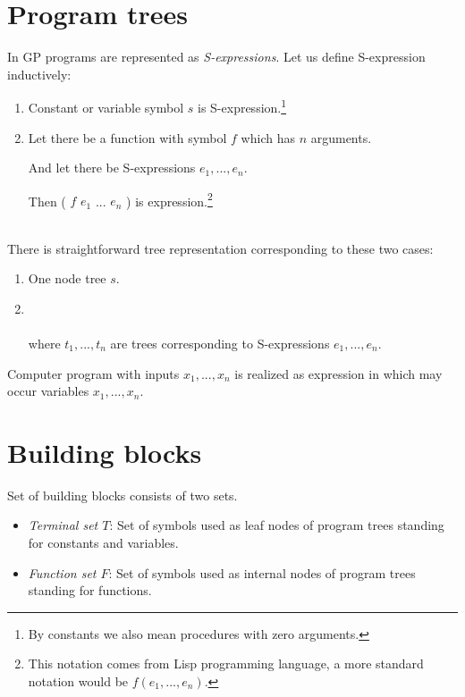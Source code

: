 \documentclass[12pt,a4paper]{report}
\newcommand{\Lets}{Let us\xspace}
\begin{document}
\newpage
\section{Program trees}
\label{GP-prog-trees}

In GP programs are represented as \textit{S-expressions}. 
\Lets define S-expression inductively:

\begin{samepage}
\begin{enumerate}
	\item Constant or variable symbol $s$ is S-expression.\footnote{
	      By constants we also mean procedures with zero arguments.}
	\item Let there be a function with symbol $f$ which has $n$ arguments.
	 
	      And let there be S-expressions $e_{1}, ..., e_{n}$. 
	      
	      Then ( $f$ $e_{1}$ ... $e_{n}$ ) is expression.\footnote{
	      This notation comes from Lisp programming language, 
	      a more standard notation would be $f(e_{1}, ... ,e_{n})$.}   
\end{enumerate}
\end{samepage}~\\
There is straightforward tree representation corresponding to these two cases:

\begin{enumerate}
	\item One node tree $s$.
    \item \mbox{}\\\\
		 where $t_{1}, ..., t_{n}$ are trees corresponding 
		 to S-expressions $e_{1}, ..., e_{n}$.	   
\end{enumerate}

Computer program with inputs $x_{1}, ..., x_{n}$ is realized as expression in which 
may occur variables $x_{1}, ..., x_{n}$.



\section{Building blocks}
\label{building-blocks}

Set of building blocks consists of two sets.

\begin{itemize}
	\item \textit{Terminal set $T$}: Set of symbols used as leaf nodes of 	               
	      program trees standing for constants and variables.
	\item \textit{Function set $F$}: Set of symbols used as internal nodes 
	      of program trees standing for functions.
\end{itemize}
\end{document}
